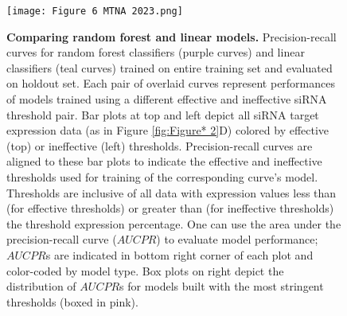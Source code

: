\documentclass{report}
\begin{document}
\begin{figure}
    \centering
    \texttt{[image: Figure 6 MTNA 2023.png]}
    \caption{\textbf{Comparing random forest and linear models. }Precision-recall curves for random forest classifiers (purple curves) and linear classifiers (teal curves) trained on entire training set and evaluated on holdout set. Each pair of overlaid curves represent performances of models trained using a different effective and ineffective siRNA threshold pair. Bar plots at top and left depict all siRNA target expression data (as in Figure \ref{fig:Figure* 2}D) colored by effective (top) or ineffective (left) thresholds. Precision-recall curves are aligned to these bar plots to indicate the effective and ineffective thresholds used for training of the corresponding curve’s model. Thresholds are inclusive of all data with expression values less than (for effective thresholds) or greater than (for ineffective thresholds) the threshold expression percentage. One can use the area under the precision-recall curve ($AUCPR$) to evaluate model performance; $AUCPR$s are indicated in bottom right corner of each plot and color-coded by model type. Box plots on right depict the distribution of $AUCPR$s for models built with the most stringent thresholds (boxed in pink).
}
    \label{fig:Figure* 6}
\end{figure}
\end{document}
